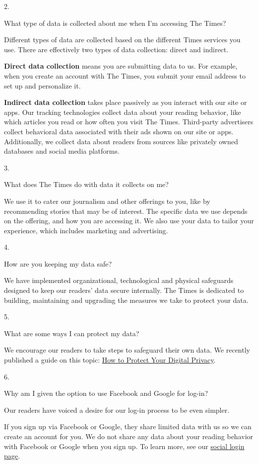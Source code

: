 2.

What type of data is collected about me when I'm accessing The Times?

Different types of data are collected based on the different Times
services you use. There are effectively two types of data collection:
direct and indirect.

\textbf{Direct data collection} means you are submitting data to us. For
example, when you create an account with The Times, you submit your
email address to set up and personalize it.

\textbf{Indirect data collection} takes place passively as you interact
with our site or apps. Our tracking technologies collect data about your
reading behavior, like which articles you read or how often you visit
The Times. Third-party advertisers collect behavioral data associated
with their ads shown on our site or apps. Additionally, we collect data
about readers from sources like privately owned databases and social
media platforms.

3.

What does The Times do with data it collects on me?

We use it to cater our journalism and other offerings to you, like by
recommending stories that may be of interest. The specific data we use
depends on the offering, and how you are accessing it. We also use your
data to tailor your experience, which includes marketing and
advertising.

4.

How are you keeping my data safe?

We have implemented organizational, technological and physical
safeguards designed to keep our readers' data secure internally. The
Times is dedicated to building, maintaining and upgrading the measures
we take to protect your data.

5.

What are some ways I can protect my data?

We encourage our readers to take steps to safeguard their own data. We
recently published a guide on this topic:
\href{https://www.nytimes.com/guides/privacy-project/how-to-protect-your-digital-privacy}{How
to Protect Your Digital Privacy}.

6.

Why am I given the option to use Facebook and Google for log-in?

Our readers have voiced a desire for our log-in process to be even
simpler.

If you sign up via Facebook or Google, they share limited data with us
so we can create an account for you. We do not share any data about your
reading behavior with Facebook or Google when you sign up. To learn
more, see our
\href{https://help.nytimes.com/hc/en-us/articles/115014887628-Social-login}{social
login page}.

